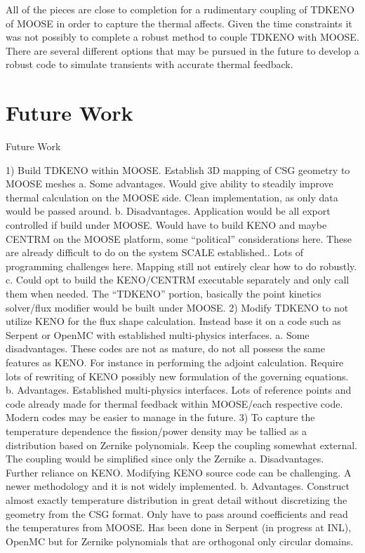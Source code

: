 \documentclass[11pt]{article}
\begin{document}
All of the pieces are close to completion for a rudimentary coupling of TDKENO of MOOSE in order to capture the thermal affects.  Given the time constraints it was not possibly to complete a robust method to couple TDKENO with MOOSE.  There are several different options that may be pursued in the future to develop a robust code to simulate transients with accurate thermal feedback. 

\section{Future Work}

Future Work 
 
1)	Build TDKENO within MOOSE.  Establish 3D mapping of CSG geometry to MOOSE meshes
a.	Some advantages.  Would give ability to steadily improve thermal calculation on the MOOSE side. Clean implementation, as only data would be passed around.  
b.	Disadvantages.  Application would be all export controlled if build under MOOSE.  Would have to build KENO and maybe CENTRM on the MOOSE platform, some “political” considerations here.  These are already difficult to do on the system SCALE established..  Lots of programming challenges here. Mapping still not entirely clear how to do robustly.
c.	Could opt to build the KENO/CENTRM executable separately and only call them when needed.  The “TDKENO” portion, basically the point kinetics solver/flux modifier would be built under MOOSE.
2)	Modify TDKENO to not utilize KENO for the flux shape calculation.  Instead base it on a code such as Serpent or OpenMC with established multi-physics interfaces.  
a.	Some disadvantages.  These codes are not as mature, do not all possess the same features as KENO.  For instance in performing the adjoint calculation.   Require lots of rewriting of KENO possibly new formulation of the governing equations.
b.	Advantages.  Established multi-physics interfaces.  Lots of reference points and code already made for thermal feedback within MOOSE/each respective code. Modern codes may be easier to manage in the future.  
3)	To capture the temperature dependence the fission/power density may be tallied as a distribution based on Zernike polynomials.  Keep the coupling somewhat external.  The coupling would be simplified since only the Zernike
a.	Disadvantages.  Further reliance on KENO.  Modifying KENO source code can be challenging.  A newer methodology and it is not widely implemented.
b.	Advantages.  Construct almost exactly temperature distribution in great detail without discretizing the geometry from the CSG format.  Only have to pass around coefficients and read the temperatures from MOOSE.  Has been done in Serpent (in progress at INL), OpenMC but for Zernike polynomials that are orthogonal only circular domains.  
\end{document}
